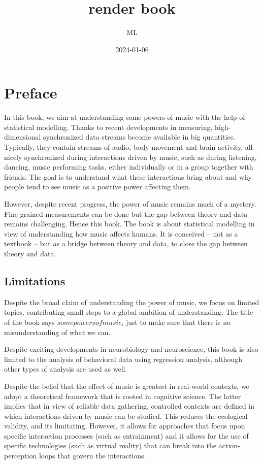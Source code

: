 \documentclass[
]{book}
\title{render book}
\author{ML}
\date{2024-01-06}
\theoremstyle{definition}
\theoremstyle{definition}
\theoremstyle{definition}
\theoremstyle{definition}
\theoremstyle{remark}
\begin{document}
\maketitle

{
\setcounter{tocdepth}{1}
\tableofcontents
}
\hypertarget{preface}{%
\chapter{Preface}\label{preface}}


In this book, we aim at understanding some powers of music with the help of statistical modelling.
Thanks to recent developments in measuring, high-dimensional synchronized data streams become available in big quantities. Typically, they contain streams of audio, body movement and brain activity, all nicely synchronized during interactions driven by music, such as during listening, dancing, music performing tasks, either individually or in a group together with friends.
The goal is to understand what these interactions bring about and why people tend to see music as a positive power affecting them.

However, despite recent progress, the power of music remains much of a mystery.
Fine-grained measurements can be done but the gap between theory and data remains challenging.
Hence this book.
The book is about statistical modelling in view of understanding how music affects humans. It is conceived -- not as a textbook -- but as a bridge between theory and data, to close the gap between theory and data.

\hypertarget{limitations}{%
\section{Limitations}\label{limitations}}

Despite the broad claim of understanding the power of music, we focus on limited topics, contributing small steps to a global ambition of understanding. The title of the book says \(some powers of music\), just to make sure that there is no misunderstanding of what we can.

Despite exciting developments in neurobiology and neuroscience, this book is also limited to the analysis of behavioral data using regression analysis, although other types of analysis are used as well.

Despite the belief that the effect of music is greatest in real-world contexts, we adopt a
theoretical framework that is rooted in cognitive science. The latter implies that in view of reliable data gathering, controlled contexts are defined in which interactions driven by music can be studied. This reduces the ecological validity, and its limitating. However, it allows for approaches that focus upon specific interaction processes (such as entrainment) and it allows for the use of specific technologies (such as virtual reality) that can break into the action-perception loops that govern the interactions.
\end{document}
